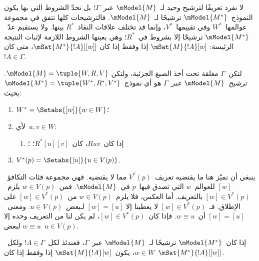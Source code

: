 \documentclass[../../../include/open-logic-section]{subfiles}
\begin{document}


لا نفرد تعريفًا لترشيح وحيد لـ~$\mModel{M}$
عبر~$\Gamma$؛ بل نحدّ الشروط التي بها يكون
النموذج~$\mModel{M^*}$ ترشيحًا لـ~$\mModel{M}$.
فالترشيحات كلها تتفق في مجموعة عوالمها~$W^*$
وفي تقييمها~$V^*$، وإنما قد تختلف علاقات
  النفاذ~$R^*$ بينها. ولا يستقيم عدّ~$\mModel{M^*}$ ترشيحًا إلا
بشروط في~$R^*$؛ وهي بعينها الشروط اللازمة
لإثبات النتيجة الرئيسة:
$\mSat{M}{!A}[w]$ إذا وفقط إذا كان
$\mSat{M^*}{!A}[{[w]}]$، متى كان~$!A \in \Gamma$.

\begin{defn}
  لتكن~$\Gamma$ مغلقة تحت أخذ الصيغ الجزئية، ولتكن
  $\mModel{M}=\tuple{W,R,V}$. \emph{ترشيح~$\mModel{M}$ عبر~$\Gamma$}
  هو أي نموذج~$\mModel{M^*}=\tuple{W^*,R^*,V^*}$ بحيث:
  \begin{enumerate}
  \item $W^*=\Setabs{[w]}{w \in W}$؛
  \item {}%
    لأي~$u,v \in W$:
    \begin{enumerate}
    \item {}%
      إذا كان~$Ruv$، كان~$R^*[u][v]$؛
    ؛
    \end{enumerate}
  \item $V^*(p)=\Setabs{[u]}{u \in V(p)}$.
  \end{enumerate}
\end{defn}

ينبغي أن نميّز هنا ما يقتضيه تعريف~$V^*(p)$
مما لا يقتضيه. فهي مجموعة فئات التكافؤ~$[w]$
للعوالم~$w$ التي تصدق فيها~$p$ في~$\mModel{M}$.
فمن~$w \in V(p)$ يلزم~$[w] \in V^*(p)$
بالتعريف. أما العكس، فلا يلزم~$w \in V(p)$
من~$[w] \in V^*(p)$ على الإطلاق.
فـ~$[w] \in V^*(p)$ لا يعطينا إلا
$[w]=[u]$ لـ\emph{بعض}~$u \in V(p)$.
ومعنى~$[w]=[u]$ أن~$w \equiv u$.
فإذا كان~$[w] \in V^*(p)$، لم يكن لنا من
التعريف وحده إلا $w \equiv u$ لبعض~$u \in V(p)$.

\begin{thm}
  إذا كان~$\mModel{M^*}$ ترشيحًا لـ~$\mModel{M}$ عبر~$\Gamma$، فعندئذ
  لكل~$!A \in \Gamma$ ولكل~$w \in W$، يكون~$\mSat{M}{!A}[w]$ إذا
  وفقط إذا كان~$\mSat{M^*}{!A}[{[w]}]$.
\end{thm}
\end{document}
